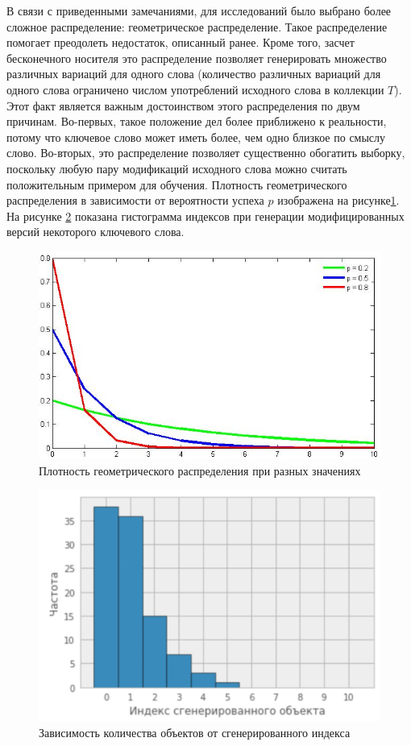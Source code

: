 В связи с приведенными замечаниями, для исследований было выбрано более сложное распределение: геометрическое распределение. Такое распределение помогает преодолеть недостаток, описанный ранее. Кроме того, засчет бесконечного носителя это распределение позволяет генерировать множество различных вариаций для одного слова (количество различных вариаций для одного слова ограничено числом употреблений исходного слова в коллекции $T$). Этот факт является важным достоинством этого распределения по двум причинам. Во-первых, такое положение дел более приближено к реальности, потому что ключевое слово может иметь более, чем одно близкое по смыслу слово. Во-вторых, это распределение позволяет существенно обогатить выборку, поскольку любую пару модификаций исходного слова можно считать положительным примером для обучения. Плотность геометрического распределения в зависимости от вероятности успеха $p$ изображена на рисунке\ref{img:geom_distr}. На рисунке \ref{img:geom_distr_2} показана гистограмма индексов при генерации модифицированных версий некоторого ключевого слова.

\begin{figure}[ht]
  \begin{minipage}[ht]{1.0\linewidth}\centering
    \includegraphics[width=0.7\linewidth]{Dissertation/pics/geom_distr}
    \caption{Плотность геометрического распределения при разных значениях}
    \label{img:geom_distr}
  \end{minipage}
\end{figure}

\begin{figure}[ht]
  \begin{minipage}[ht]{1.0\linewidth}\centering
    \includegraphics[width=0.7\linewidth]{Dissertation/pics/geom_distr_2}
    \caption{Зависимость количества объектов от сгенерированного индекса}
    \label{img:geom_distr_2}
  \end{minipage}
\end{figure}

